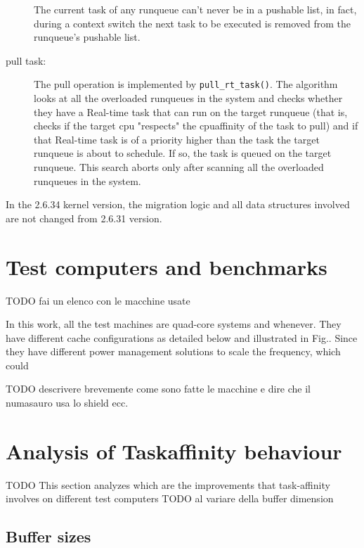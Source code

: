 \begin{description}
The current task of any runqueue can't never be in a pushable list, in fact, during a context switch the next task to be executed is removed from the 
runqueue's pushable list.

\item[pull task:] The pull operation is implemented by \texttt{pull\_rt\_task()}. The algorithm looks at all the overloaded runqueues in the system 
and checks whether they have a Real-time task that can run on the target runqueue (that is, checks if the target cpu "respects" the cpuaffinity of the 
task to pull) and if that Real-time task is of a priority higher than the task the target runqueue is about to schedule. If so, the task is queued on 
the target runqueue. This search aborts only after scanning all the overloaded runqueues in the system. 

\end{description}

In the 2.6.34 kernel version, the migration logic and all data structures involved are not changed from 2.6.31 version.

\section{Test computers and benchmarks}

TODO fai un elenco con le macchine usate

In this work, all the test machines are quad-core 
systems and whenever. They have different cache configurations
as detailed below and illustrated in Fig.. Since they have different
power management solutions to scale the frequency, which could

TODO descrivere brevemente come sono fatte le macchine e dire che il numasauro usa lo shield ecc.

\section{Analysis of Taskaffinity behaviour}

TODO 
This section analyzes which are the improvements that task-affinity involves on different test computers TODO al variare della buffer dimension




\subsection{Buffer sizes}

